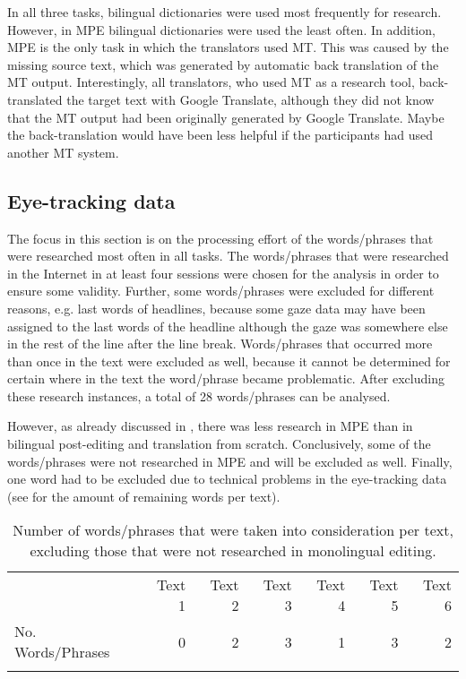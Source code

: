\documentclass[output=paper]{langsci/langscibook}
\begin{document}
In all three tasks, bilingual dictionaries were used most frequently for research. However, in MPE bilingual dictionaries were used the least often. In addition, MPE is the only task in which the translators used MT. This was caused by the missing source text, which was generated by automatic back translation of the MT output. Interestingly, all translators, who used MT as a research tool, back-translated the target text with Google Translate, although they did not know that the MT output had been originally generated by Google Translate. Maybe the back-translation would have been less helpful if the participants had used another MT system.


\subsection{Eye-tracking data\label{nitzke:sec:EyeTrackingData}}

The focus in this section is on the processing effort of the words/phrases that were researched most often in all tasks. The words/phrases that were researched in the Internet in at least four sessions were chosen for the analysis in order to ensure some validity. Further, some words/phrases were excluded for different reasons, e.g. last words of headlines, because some gaze data may have been assigned to the last words of the headline although the gaze was somewhere else in the  rest of the line after the line break. Words/phrases that occurred more than once in the text were excluded as well, because it cannot be determined for certain where in the text the word/phrase became problematic. After excluding these research instances, a total of 28 words/phrases can be analysed.


However, as already discussed in , there was less research in MPE than in bilingual post-editing and translation from scratch. Conclusively, some of the words/phrases were not researched in MPE and will be excluded as well. Finally, one word had to be excluded due to technical problems in the eye-tracking data (see  for the amount of remaining words per text). 

\begin{table}
\begin{tabular}{lrrrrrr} & Text 1 & Text 2 & Text 3 & Text 4 & Text 5 & Text 6\\
\lsptoprule
No. Words/Phrases & 0 & 2 & 3 & 1 & 3 & 2\\
\lspbottomrule
\end{tabular}
\caption{Number of words/phrases that were taken into consideration per text, excluding those that were not researched in monolingual editing.}
\label{nitzke:tab:2}
\end{table}
\end{document}
